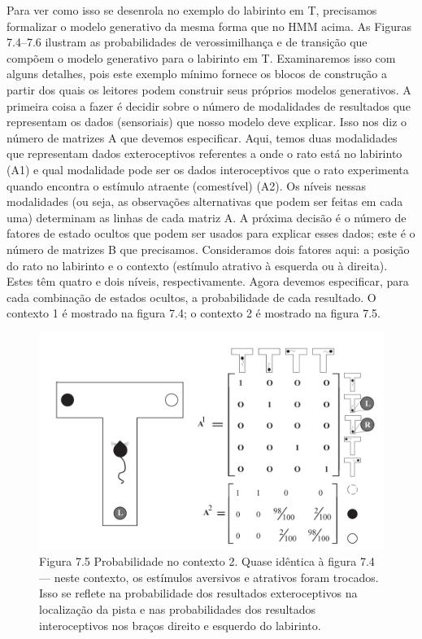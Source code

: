 \documentclass[
  12pt,
]{book}
\begin{document}
Para ver como isso se desenrola no exemplo do labirinto em T, precisamos formalizar o modelo generativo da mesma forma que no HMM acima. As Figuras 7.4--7.6 ilustram as probabilidades de verossimilhança e de transição que compõem o modelo generativo para o labirinto em T. Examinaremos isso com alguns detalhes, pois este exemplo mínimo fornece os blocos de construção a partir dos quais os leitores podem construir seus próprios modelos generativos. A primeira coisa a fazer é decidir sobre o número de modalidades de resultados que representam os dados (sensoriais) que nosso modelo deve explicar. Isso nos diz o número de matrizes A que devemos especificar. Aqui, temos duas modalidades que representam dados exteroceptivos referentes a onde o rato está no labirinto (A1) e qual modalidade pode ser os dados interoceptivos que o rato experimenta quando encontra o estímulo atraente (comestível) (A2). Os níveis nessas modalidades (ou seja, as observações alternativas que podem ser feitas em cada uma) determinam as linhas de cada matriz A. A próxima decisão é o número de fatores de estado ocultos que podem ser usados \hspace{0pt}\hspace{0pt}para explicar esses dados; este é o número de matrizes B que precisamos. Consideramos dois fatores aqui: a posição do rato no labirinto e o contexto (estímulo atrativo à esquerda ou à direita). Estes têm quatro e dois níveis, respectivamente. Agora devemos especificar, para cada combinação de estados ocultos, a probabilidade de cada resultado. O contexto 1 é mostrado na figura 7.4; o contexto 2 é mostrado na figura 7.5.

\begin{figure}
\centering
\includegraphics{images/Figura_7_5.png}
\caption{Figura 7.5 Probabilidade no contexto 2. Quase idêntica à figura 7.4 --- neste contexto, os estímulos aversivos e atrativos foram trocados. Isso se reflete na probabilidade dos resultados exteroceptivos na localização da pista e nas probabilidades dos resultados interoceptivos nos braços direito e esquerdo do labirinto.}
\end{figure}
\end{document}
